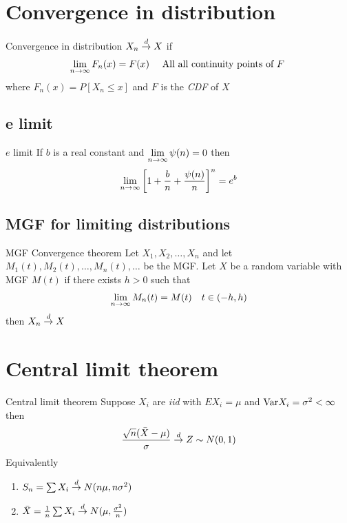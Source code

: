 \documentclass[16pt,a4paper]{article}
\begin{document}
\newpage
\section{Convergence in distribution}

\begin{defn}{Convergence in distribution}
$X_n \overset{d}{\to} X$ if 
\begin{align*}
\lim\limits_{n \rightarrow \infty} F_n(x) = F(x) && \text{ All all continuity points of $F$ } 
\end{align*}
where $F_n(x) = P[X_n \leq x]$ and $F$ is the \textit{CDF} of $X$
\end{defn}

\subsection{e limit}
\begin{thm}{$e$ limit}
If $b$ is a real constant and $\lim\limits_{n \rightarrow \infty}\psi(n) = 0$ then 
\begin{align*}
\lim\limits_{n \rightarrow \infty} \left[1+\frac{b}{n}+\frac{\psi(n)}{n}\right]^n = e^b
\end{align*} 
\end{thm}

\subsection{MGF for limiting distributions}
\begin{thm}{MGF Convergence theorem}
Let $X_1, X_2, \ldots, X_n$ and let $M_1(t), M_2(t), \ldots, M_n(t), \ldots$ be the MGF. Let $X$ be a random variable with MGF $M(t)$ if there exists $h> 0$ such that 
\begin{align*}
\lim\limits_{n \rightarrow \infty} M_n(t) = M(t) && t \in (-h,h)
\end{align*}
then $X_n \overset{d}{\to} X$
\end{thm}
\newpage
\section{Central limit theorem}
\begin{thm}{Central limit theorem}
Suppose $X_i$ are \textit{iid} with $EX_i = \mu$ and $\mathrm{Var} X_i = \sigma^2 < \infty$ then 
\begin{align*}
\frac{\sqrt{n}(\bar{X}-\mu)}{\sigma} \overset{d}{\to} Z \sim N(0,1)
\end{align*}
Equivalently 
\begin{enumerate}[(1)]
\item $S_n = \sum X_i \overset{d}{\to} N(n\mu, n\sigma^2)$
\item $\bar{X}= \frac{1}{n}\sum X_i \overset{d}{\to} N(\mu, \frac{\sigma^2}{n})$

\end{enumerate} 
\end{thm}
\newpage
\end{document}
